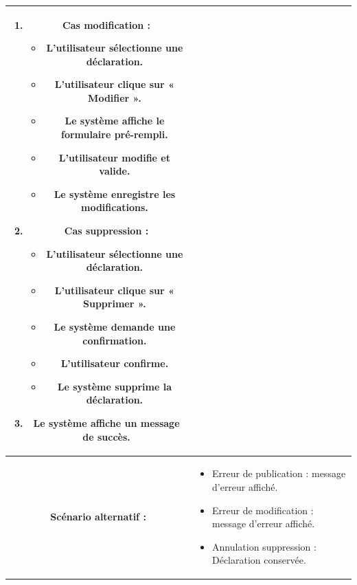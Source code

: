 \begin{longtable}{|c|p{11cm}|}
\begin{enumerate}
\item \textbf{Cas modification :}
\begin{itemize}
\item L’utilisateur sélectionne une déclaration.
\item L’utilisateur clique sur « Modifier ».
\item Le système affiche le formulaire pré-rempli.
\item L’utilisateur modifie et valide.
\item Le système enregistre les modifications.
\end{itemize}

\item \textbf{Cas suppression :}
\begin{itemize}
\item L’utilisateur sélectionne une déclaration.
\item L’utilisateur clique sur « Supprimer ».
\item Le système demande une confirmation.
\item L’utilisateur confirme.
\item Le système supprime la déclaration.
\end{itemize}

\item Le système affiche un message de succès.
\end{enumerate} \\

\hline
\cellcolor{coloranifound}\textbf{Scénario alternatif :} &
\begin{itemize}
\item Erreur de publication : message d’erreur affiché.
\item Erreur de modification : message d’erreur affiché.
\item Annulation suppression : Déclaration conservée.
\end{itemize} \\
\hline

\end{longtable}
\newpage 
